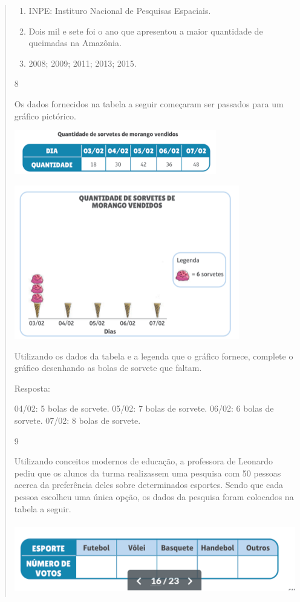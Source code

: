 \begin{mdframed}[linewidth=2pt,linecolor=salmao,roundcorner=2pt]
\begin{itemize}
{\begin{itemize}
\begin{escolha}
{\begin{quote}
{\begin{escolha}
{{{\begin{enumerate}
\item
  INPE: Instituro Nacional de Pesquisas Espaciais.
\item
  Dois mil e sete foi o ano que apresentou a maior quantidade de
  queimadas na Amazônia.
\item
  2008; 2009; 2011; 2013; 2015.
\end{enumerate}

\num{8}

Os dados fornecidos na tabela a seguir começaram ser passados para um
gráfico pictórico.

\includegraphics[width=3.47436in,height=0.75022in]{media/image100.png}

\includegraphics[width=3.86538in,height=2.63899in]{media/image101.png}

Utilizando os dados da tabela e a legenda que o gráfico fornece,
complete o gráfico desenhando as bolas de sorvete que faltam.

Resposta:

04/02: 5 bolas de sorvete.
05/02: 7 bolas de sorvete.
06/02: 6 bolas de sorvete.
07/02: 8 bolas de sorvete.

\num{9}

Utilizando conceitos modernos de educação, a professora de Leonardo
pediu que os alunos da turma realizassem uma pesquisa com 50 pessoas acerca da
preferência deles sobre determinados esportes. Sendo que cada pessoa
escolheu uma única opção, os dados da pesquisa foram colocados na tabela
a seguir.

\includegraphics[width=5.39213in,height=1.22511in]{media/image102.png}

}}}
\end{escolha}}
\end{quote}}
\end{escolha}
\end{itemize}}
\end{itemize}
\end{mdframed}
